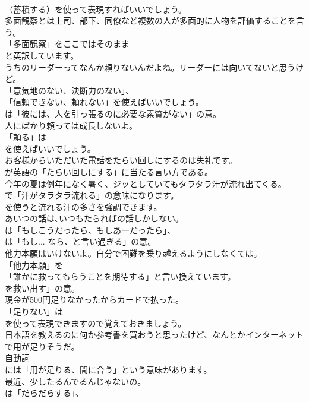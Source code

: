 \documentclass[8pt]{extreport}
\begin{document}
\begin{CJK}{UTF8}{min}
\\	（蓄積する）を使って表現すればいいでしょう。	
\\	多面観察とは上司、部下、同僚など複数の人が多面的に人物を評価することを言う。 
\\	「多面観察」をここではそのまま
\\	と英訳しています。	
\\	うちのリーダーってなんか頼りないんだよね。リーダーには向いてないと思うけど。 
\\	「意気地のない、決断力のない」、
\\	「信頼できない、頼れない」を使えばいいでしょう。
\\	は「彼には、人を引っ張るのに必要な素質がない」の意。	
\\	人にばかり頼っては成長しないよ。 
\\	「頼る」は
\\	を使えばいいでしょう。	
\\	お客様からいただいた電話をたらい回しにするのは失礼です。 
\\	が英語の「たらい回しにする」に当たる言い方である。	
\\	今年の夏は例年になく暑く、ジッとしていてもタラタラ汗が流れ出てくる。 
\\	で「汗がタラタラ流れる」の意味になります。
\\	を使うと流れる汗の多さを強調できます。	
\\	あいつの話は､いつもたらればの話しかしない｡ 
\\	は「もしこうだったら、もしあーだったら」、
\\	は「もし... なら、と言い過ぎる」の意。	
\\	他力本願はいけないよ。自分で困難を乗り越えるようにしなくては。 
\\	「他力本願」を
\\	「誰かに救ってもらうことを期待する」と言い換えています。
\\	を救い出す」の意。	
\\	現金が500円足りなかったからカードで払った。 
\\	「足りない」は 
\\	を使って表現できますので覚えておきましょう。	
\\	日本語を教えるのに何か参考書を買おうと思ったけど、なんとかインターネットで用が足りそうだ。 
\\	自動詞 
\\	には「用が足りる、間に合う」という意味があります。	
\\	最近、少したるんでるんじゃないの。 
\\	は「だらだらする」、

\end{CJK}
\end{document}

